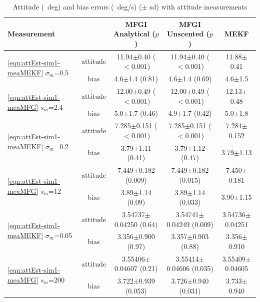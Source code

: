 \begin{table}
	\centering
	\caption{Attitude (\SI{}{deg}) and bias errors (\SI{}{deg/\second}) ($\pm$ sd) with attitude measurements \label{tab:attEst-sim1-error}}
	\footnotesize
	\begin{tabular}{l|c|ccc}
		Measurement &  & MFGI Analytical ($p$) & MFGI Unscented ($p$) & MEKF \\ \hline \hline
		\multirow{2}{*}{\eqref{eqn:attEst-sim1-meaMEKF} $\sigma_m$=0.5} & attitude & 11.94$\pm$0.40 ($<$0.001) & 11.94$\pm$0.40 ($<$0.001) & 11.88$\pm$0.41 \\
		& bias & 4.6$\pm$1.4 (0.81) & 4.6$\pm$1.4 (0.69) & 4.6$\pm$1.5 \\ \hline
		\multirow{2}{*}{\eqref{eqn:attEst-sim1-meaMFG} $s_m$=2.4} & attitude & 12.00$\pm$0.49 ($<$0.001) & 12.00$\pm$0.49 ($<$0.001) & 12.13$\pm$0.48 \\
		& bias & 5.0$\pm$1.7 (0.46) & 4.9$\pm$1.7 (0.42) & 5.0$\pm$1.8 \\ \hline \hline
		\multirow{2}{*}{\eqref{eqn:attEst-sim1-meaMEKF} $\sigma_m$=0.2} & attitude & 7.285$\pm$0.151 ($<$0.001) & 7.285$\pm$0.151 ($<$0.001) & 7.284$\pm$0.152 \\
		& bias & 3.79$\pm$1.11 (0.41) & 3.79$\pm$1.12 (0.47) & 3.79$\pm$1.13 \\ \hline
		\multirow{2}{*}{\eqref{eqn:attEst-sim1-meaMFG} $s_m$=12} & attitude & 7.449$\pm$0.182 (0.009) & 7.449$\pm$0.182 (0.015) & 7.450$\pm$0.181 \\
		& bias & 3.89$\pm$1.14 (0.09) & 3.89$\pm$1.14 (0.033) & 3.90$\pm$1.15 \\ \hline \hline
		\multirow{2}{*}{\eqref{eqn:attEst-sim1-meaMEKF} $\sigma_m$=0.05} & attitude & 3.54737$\pm$0.04250 (0.64) & 3.54741$\pm$0.04249 (0.009) & 3.54736$\pm$0.04251 \\
		& bias & 3.356$\pm$0.900 (0.97) & 3.357$\pm$0.903 (0.88) & 3.356$\pm$0.910 \\ \hline
		\multirow{2}{*}{\eqref{eqn:attEst-sim1-meaMFG} $s_m$=200} & attitude & 3.55406$\pm$0.04607 (0.21) & 3.55414$\pm$0.04606 (0.035) & 3.55409$\pm$0.04605 \\
		& bias & 3.722$\pm$0.939 (0.053) & 3.726$\pm$0.940 (0.031) & 3.733$\pm$0.940 \\ \hline \hline
	\end{tabular}
\end{table}

